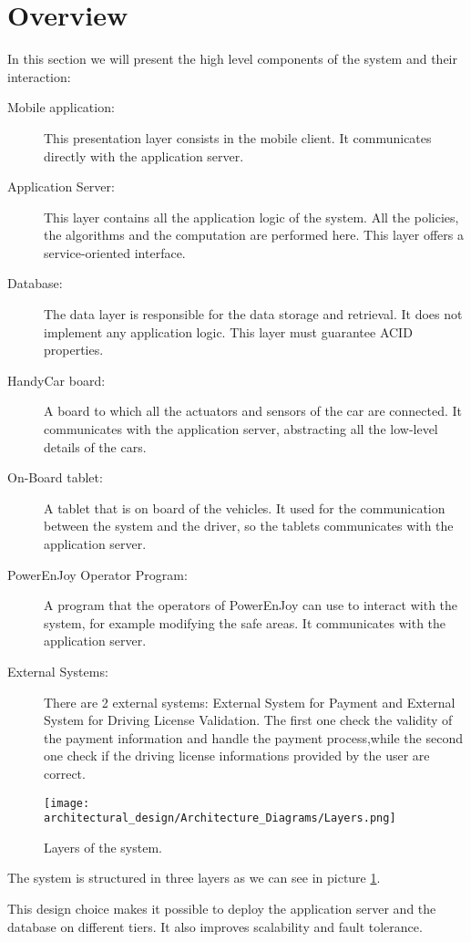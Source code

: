 \section{Overview}
In this section we will present the high level components of the system and their interaction:

\begin{description}
\item[Mobile application:] This presentation layer consists in the mobile client. It communicates directly with the application server.
\item[Application Server:] This layer contains all the application logic of the system. All the policies, the algorithms and the computation are performed here. This layer offers a service-oriented interface.
\item[Database:] The data layer is responsible for the data storage and retrieval. It does not implement any application logic. This layer must guarantee ACID properties. 
\item[HandyCar board:] A board to which all the actuators and sensors of the car are connected.
It communicates with the application server, abstracting all the low-level details of the cars.
\item[On-Board tablet:] A tablet that is on board of the vehicles. It used for the communication between the system and the driver, so the tablets communicates with the application server.
\item[PowerEnJoy Operator Program:] A program that the operators of PowerEnJoy can use to interact with the system, for example modifying the safe areas. It communicates with the application server.
\item[External Systems:]There are 2 external systems: External System for Payment and External System for Driving License Validation. The first one check the validity of the payment information and handle the payment process,while the second one check if the driving license informations provided by the user are correct.
\end{description}

\begin{figure}
	\centering
	\texttt{[image: architectural\_design/Architecture\_Diagrams/Layers.png]}
	\caption{Layers of the system.}
	\label{fig:layers}
\end{figure}

The system is structured in three layers as we can see in picture \ref{fig:layers}.

This design choice makes it possible to deploy the application server and the database on different tiers. It also improves scalability and fault tolerance.


